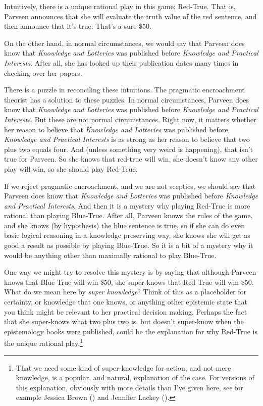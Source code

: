 \documentclass[
  11pt,
  letterpaper,
  DIV=11,
  numbers=noendperiod,
  twoside]{scrartcl}
\begin{document}
Intuitively, there is a unique rational play in this game: Red-True.
That is, Parveen announces that she will evaluate the truth value of the
red sentence, and then announce that it's true. That's a sure \$50.

On the other hand, in normal circumstances, we would say that Parveen
does know that \emph{Knowledge and Lotteries} was published before
\emph{Knowledge and Practical Interests}. After all, she has looked up
their publication dates many times in checking over her papers.

There is a puzzle in reconciling these intuitions. The pragmatic
encroachment theorist has a solution to these puzzles. In normal
circumstances, Parveen does know that \emph{Knowledge and Lotteries} was
published before \emph{Knowledge and Practical Interests}. But these are
not normal circumstances. Right now, it matters whether her reason to
believe that \emph{Knowledge and Lotteries} was published before
\emph{Knowledge and Practical Interests} is as strong as her reason to
believe that two plus two equals four. And (unless something very weird
is happening), that isn't true for Parveen. So she knows that red-true
will win, she doesn't know any other play will win, so she should play
Red-True.

If we reject pragmatic encroachment, and we are not sceptics, we should
say that Parveen does know that \emph{Knowledge and Lotteries} was
published before \emph{Knowledge and Practical Interests}. And then it
is a mystery why playing Red-True is more rational than playing
Blue-True. After all, Parveen knows the rules of the game, and she knows
(by hypothesis) the blue sentence is true, so if she can do even basic
logical reasoning in a knowledge preserving way, she knows she will get
as good a result as possible by playing Blue-True. So it is a bit of a
mystery why it would be anything other than maximally rational to play
Blue-True.

One way we might try to resolve this mystery is by saying that although
Parveen knows that Blue-True will win \$50, she super-knows that
Red-True will win \$50. What do we mean here by \emph{super knowledge}?
Think of this as a placeholder for certainty, or knowledge that one
knows, or anything other epistemic state that you think might be
relevant to her practical decision making. Perhaps the fact that she
super-knows what two plus two is, but doesn't super-know when the
epistemology books were published, could be the explanation for why
Red-True is the unique rational play.\footnote{That we need some kind of
  super-knowledge for action, and not mere knowledge, is a popular, and
  natural, explanation of the case. For versions of this explanation,
  obviously with more details than I've given here, see for example
  Jessica Brown () and Jennifer Lackey
  ().}
\end{document}
